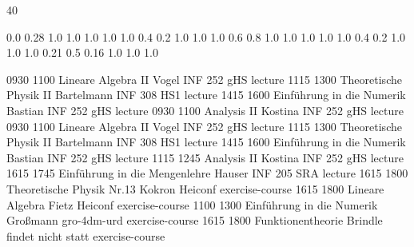 \documentclass[a4paper,10pt]{report}
\begin{document}
\thispagestyle{empty}
\begin{landscape}
\noindent{}

\setslotsize{2.8cm}{0.3cm}
 {40}
\settextframe{0.8mm}

\seteventcornerradius{0pt}


			{0.0} 	{0.28}	{1.0} 	{1.0}	{1.0}	{1.0}
 	{1.0} 	{0.4} 	{0.2} 	{1.0}	{1.0}	{1.0}
   		{0.6} 	{0.8} 	{1.0} 	{1.0}	{1.0}	{1.0}
 		{1.0} 	{0.4} 	{0.2} 	{1.0}	{1.0}	{1.0}
       		{0.21}	{0.5} 	{0.16}	{1.0}	{1.0}	{1.0}

\begin{timetable}
   {0930} {1100} {Lineare Algebra II}             {Vogel}      	  {INF 252 gHS} 		{lecture}
   {1115} {1300} {Theoretische Physik II}         {Bartelmann}    {INF 308 HS1}     {lecture}
   {1415} {1600} {Einführung in die Numerik}      {Bastian}      	{INF 252 gHS}    	{lecture}
   {0930} {1100} {Analysis II}     							  {Kostina}     	{INF 252 gHS}     {lecture}
   {0930} {1100} {Lineare Algebra II}             {Vogel}         {INF 252 gHS} 		{lecture}
   {1115} {1300} {Theoretische Physik II} 		    {Bartelmann}   	{INF 308 HS1}    	{lecture}
   {1415} {1600} {Einführung in die Numerik}      {Bastian}       {INF 252 gHS}    	{lecture}
   {1115} {1245} {Analysis II}      		   				{Kostina}       {INF 252 gHS}    	{lecture}
   {1615} {1745} {Einführung in die Mengenlehre}  {Hauser}        {INF 205 SRA}     {lecture}        
   {1615} {1800} {Theoretische Physik}						{Nr.13 Kokron}	{Heiconf}	{exercise-course}
   {1615} {1800} {Lineare Algebra}							{Fietz}		{Heiconf}	{exercise-course}
   {1100} {1300} {Einführung in die Numerik}	{Großmann}		{gro-4dm-urd}	{exercise-course} 
   {1615} {1800} {Funktionentheorie}          {Brindle} {findet nicht statt} {exercise-course}
\end{timetable}
\end{landscape}
\end{document}
